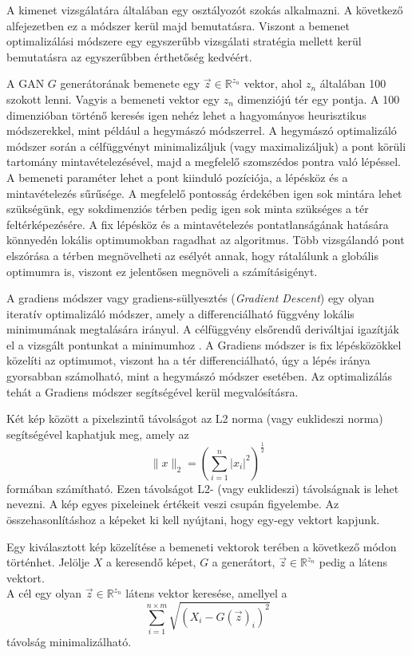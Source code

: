 A kimenet vizsgálatára általában egy osztályozót szokás alkalmazni. A következő alfejezetben ez a módszer kerül majd bemutatásra. Viszont a bemenet optimalizálási módszere egy egyszerűbb vizsgálati stratégia mellett kerül bemutatásra az egyszerűbben érthetőség kedvéért.

A GAN $G$ generátorának bemenete egy $\vec{z} \in \mathbb{R}^{z_n}$ vektor, ahol $z_n$ általában 100 szokott lenni. Vagyis a bemeneti vektor egy $z_n$ dimenziójú tér egy pontja. A 100 dimenzióban történő keresés igen nehéz lehet a hagyományos heurisztikus módszerekkel, mint például a hegymászó módszerrel. A hegymászó optimalizáló módszer során a célfüggvényt minimalizáljuk (vagy maximalizáljuk) a pont körüli tartomány mintavételezésével, majd a megfelelő szomszédos pontra való lépéssel. A bemeneti paraméter lehet a pont kiinduló pozíciója, a lépésköz és a mintavételezés sűrűsége. A megfelelő pontosság érdekében igen sok mintára lehet szükségünk, egy sokdimenziós térben pedig igen sok minta szükséges a tér feltérképezésére. A fix lépésköz és a mintavételezés pontatlanságának hatására könnyedén lokális optimumokban ragadhat az algoritmus. Több vizsgálandó pont elszórása a térben megnövelheti az esélyét annak, hogy rátalálunk a globális optimumra is, viszont ez jelentősen megnöveli a számításigényt.

A gradiens módszer vagy gradiens-süllyesztés (\textit{Gradient Descent}) egy olyan iteratív optimalizáló módszer, amely a differenciálható függvény lokális minimumának megtalására irányul. A célfüggvény elsőrendű deriváltjai igazítják el a vizsgált pontunkat a minimumhoz \cite{ruder2016overview}. A Gradiens módszer is fix lépésközökkel közelíti az optimumot, viszont ha a tér differenciálható, úgy a lépés iránya gyorsabban számolható, mint a hegymászó módszer esetében. Az optimalizálás tehát a Gradiens módszer segítségével kerül megvalósításra.

Két kép között a pixelszintű távolságot az L2 norma (vagy euklideszi norma) segítségével kaphatjuk meg, amely az
$$ \|x\|_2 = \left({\sum_{i=1}^{n}|x_i|^2}\right)^{\frac{1}{2}} $$
formában számítható.
Ezen távolságot L2- (vagy euklideszi) távolságnak is lehet nevezni. A kép egyes pixeleinek értékeit veszi csupán figyelembe. Az összehasonlításhoz a képeket ki kell nyújtani, hogy egy-egy vektort kapjunk.

Egy kiválasztott kép közelítése a bemeneti vektorok terében a következő módon történhet. Jelölje $X$ a keresendő képet, $G$ a generátort, $\vec{z} \in \mathbb{R}^{z_n}$ pedig a látens vektort.\\
A cél egy olyan $\vec{z} \in \mathbb{R}^{z_n}$ látens vektor keresése, amellyel a
$$ \sum_{i=1}^{n\times m}\sqrt{(X_i-G(\vec{z})_i)^2}$$
távolság minimalizálható.

